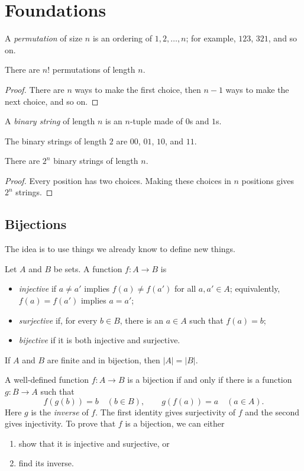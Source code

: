 \section{Foundations}
\begin{definition}
A \textit{permutation} of size $n$ is an ordering of $1,2,\ldots,n$; for example, $123$, $321$, and so on.
\end{definition}
\begin{lemma}
There are $n!$ permutations of length $n$.
\end{lemma}
\begin{proof}
There are $n$ ways to make the first choice, then $n-1$ ways to make the next choice, and so on.
\end{proof}
\begin{definition}
A \textit{binary string} of length $n$ is an $n$-tuple made of $0$s and $1$s.
\end{definition}
\begin{example}
The binary strings of length $2$ are $00$, $01$, $10$, and $11$.
\end{example}
\begin{lemma}
There are $2^n$ binary strings of length $n$.
\end{lemma}
\begin{proof}
Every position has two choices. Making these choices in $n$ positions gives $2^n$ strings.
\end{proof}

\subsection{Bijections}
The idea is to use things we already know to define new things.
\begin{definition}
Let $A$ and $B$ be sets. A function $f\colon A\to B$ is
\begin{itemize}
\item \textit{injective} if $a\ne a'$ implies $f(a)\ne f(a')$ for all $a,a'\in A$; equivalently, $f(a)=f(a')$ implies $a=a'$;
\item \textit{surjective} if, for every $b\in B$, there is an $a\in A$ such that $f(a)=b$;
\item \textit{bijective} if it is both injective and surjective.
\end{itemize}
\end{definition}
If $A$ and $B$ are finite and in bijection, then $|A|=|B|$.

A well-defined function $f\colon A\to B$ is a bijection if and only if there is a function $g\colon B\to A$ such that
\[
f(g(b))=b\quad(b\in B),\qquad g(f(a))=a\quad(a\in A).
\]
Here $g$ is the \textit{inverse} of $f$. The first identity gives surjectivity of $f$ and the second gives injectivity.
To prove that $f$ is a bijection, we can either
\begin{enumerate}
\item show that it is injective and surjective, or
\item find its inverse.
\end{enumerate}

